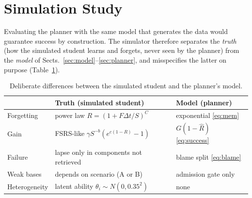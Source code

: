 \documentclass[runningheads]{llncs}
\newcommand{\Rh}{\hat R}
\begin{document}
\section{Simulation Study}
\label{sec:sim}

Evaluating the planner with the same model that generates the data would guarantee success by construction. The simulator therefore separates the \emph{truth} (how the simulated student learns and forgets, never seen by the planner) from the \emph{model} of Sects.~\ref{sec:model}--\ref{sec:planner}, and misspecifies the latter on purpose (Table~\ref{tab:truth}).

\begin{table}[t]
\centering
\caption{Deliberate differences between the simulated student and the planner's model.}
\label{tab:truth}
\setlength{\tabcolsep}{4pt}
\begin{tabularx}{\textwidth}{@{}l>{\raggedright\arraybackslash}X>{\raggedright\arraybackslash}X@{}}
\toprule
& Truth (simulated student) & Model (planner) \\
\midrule
Forgetting & power law $R=(1+F\Delta t/S)^{C}$ & exponential \eqref{eq:mem} \\
Gain & FSRS-like $\gamma S^{-b}(e^{c(1-R)}-1)$ & $G(1-\Rh)$ \eqref{eq:success} \\
Failure & lapse only in components not retrieved & blame split \eqref{eq:blame} \\
Weak bases & depends on scenario (A or B) & admission gate only \\
Heterogeneity & latent ability $\theta_i\sim N(0,0.35^2)$ & none \\
\bottomrule
\end{tabularx}
\end{table}
\end{document}
